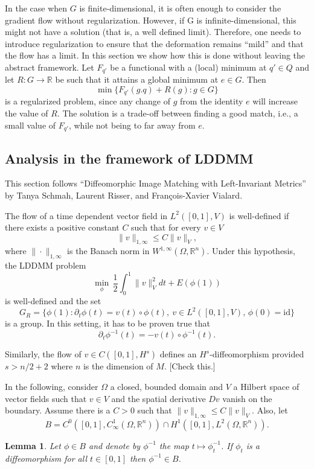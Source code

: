 \documentclass{article}
\theoremstyle{plain}
\newtheorem{lem}[teo]{Lemma}
\theoremstyle{definition}
\newcommand{\R}{\ensuremath{\mathbb{R}}}
\newcommand{\id}{\ensuremath{\mathrm{id}}}
\begin{document}
In the case when $G$ is finite-dimensional, it is often enough to consider the
gradient flow without regularization. However, if G is infinite-dimensional, this might not have a solution (that is, a well defined limit). Therefore, one needs to introduce regularization to ensure that the deformation remains ``mild'' and that the flow has a limit. In this section we show how this is done without leaving the abstract framework. Let $F_{q'}$ be a functional with a (local) minimum at $q'\in Q$ and let $R:G\to \R$ be such that it attains a global minimum at $e\in G$. Then
\[
\min \{F_{q'}(g.q)+R(g):g\in G\}
\]
is a regularized problem, since any change of $g$ from the identity $e$ will increase the value of $R$. The solution is a trade-off between finding a good match, i.e., a small value of $F_{q'}$, while not being to far away from $e$.

\subsection{Analysis in the framework of LDDMM}
This section follows ``Diffeomorphic Image Matching with Left-Invariant Metrics'' by Tanya Schmah, Laurent Risser, and François-Xavier Vialard.

The flow of a time dependent vector field in $L^2([0,1],V)$ is well-defined if there exists a positive constant $C$ such that for every $v\in V$
\[
\|v\|_{1,\infty}\leq C\|v\|_V,
\]
where $\|\cdot\|_{1,\infty}$ is the Banach norm in $W^{1,\infty}(\Omega,\R^n)$. Under this hypothesis, the LDDMM problem
\[
  \min_\phi \,\frac{1}{2}\int_0^1\|v\|^2_Vdt + E(\phi(1))
\]
is well-defined and the set
\[
  G_R=\{\phi(1) : \partial_t\phi(t)=v(t)\circ\phi(t),\ v\in L^2([0,1],V),\,\phi(0)=\id\}
\]
is a group. In this setting, it has to be proven true that
\[
\partial_t\phi^{-1}(t)=-v(t)\circ \phi^{-1}(t).
\]

Similarly, the flow of $v\in C([0,1],H^s)$ defines an $H^s$-diffeomorphism provided $s>n/2+2$ where $n$ is the dimension of $M$. [Check this.]

In the following, consider $\Omega$ a closed, bounded domain and $V$ a Hilbert space of vector fields such that $v\in V$ and the spatial derivative $Dv$ vanish on the boundary. Assume there is a $C>0$ such that $\|v\|_{1,\infty}\leq C\|v\|_V$. Also, let
\[
B=C^0([0,1],C^1_\infty(\Omega,\R^n))\cap H^1([0,1],L^2(\Omega,\R^n)).
\]

\begin{lem}
Let $\phi\in B$ and denote by $\phi^{-1}$ the map $t\mapsto \phi_t^{-1}$. If $\phi_t$ is a diffeomorphism for all $t\in[0,1]$ then $\phi^{-1}\in B$.
\end{lem}
\end{document}
